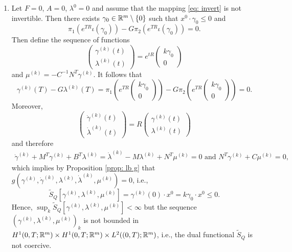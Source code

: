 \documentclass[11pt]{article}
\begin{document}
\begin{remark}
\begin{enumerate}
    \item Let $F=0$, $A=0$, $\lambda^0 = 0$ and assume that the mapping \eqref{eq: invert} is not invertible.
    Then there exists $\gamma_0 \in \mathbb R^m \setminus \{ 0\}$ such that $x^0 \cdot \gamma_0 \leq 0$ and 
    \[
    \pi_1 (e^{TR} \iota(\gamma_0)) - G \pi_2 (e^{TR} \iota (\gamma_0)) = 0.
    \]
    Then define the sequence of functions
    \[
    \begin{pmatrix} \gamma^{(k)}(t) \\ \lambda^{(k)}(t) \end{pmatrix} = e^{tR} \begin{pmatrix} k \gamma_0 \\ 0  \end{pmatrix}
    \]
    and $\mu^{(k)} = -C^{-1} N^T \gamma^{(k)}$.
    It follows that 
    \[
    \gamma^{(k)}(T) - G\lambda^{(k)}(T)   = \pi_1\left( e^{TR} \begin{pmatrix} k \gamma_0 \\ 0  \end{pmatrix}\right) - G \pi_2\left( e^{TR} \begin{pmatrix} k \gamma_0 \\ 0  \end{pmatrix}\right) = 0.
    \]
    Moreover,
    \[
    \begin{pmatrix} \dot{\gamma}^{(k)}(t) \\ \dot{\lambda}^{(k)}(t) \end{pmatrix} = R \begin{pmatrix} \gamma^{(k)}(t) \\ \lambda^{(k)}(t) \end{pmatrix}
    \]
    and therefore
    \begin{align*}
\dot{\gamma}^{(k)} + M^T \gamma^{(k)} + B^T \lambda^{(k)} = \dot{\lambda}^{(k)} - M \lambda^{(k)} + N^T \mu^{(k)} = 0 \text{ and } N^T \gamma^{(k)} + C\mu^{(k)} = 0,
    \end{align*}
    which implies by Proposition \ref{prop: lb g} that $g(\gamma^{(k)},\dot{\gamma}^{(k)},\lambda^{(k)},\dot{\lambda}^{(k)}, \mu^{(k)}) = 0$, i.e.,
    \[
    \tilde{S}_Q[\gamma^{(k)},\lambda^{(k)},\mu^{(k)}] = \gamma^{(k)}(0)\cdot x^0 = k \gamma_0 \cdot x^0 \leq 0.
    \]
    Hence, $\sup_k \tilde{S}_Q[\gamma^{(k)},\lambda^{(k)},\mu^{(k)}] < \infty$ but the sequence $(\gamma^{(k)},\lambda^{(k)}, \mu^{(k)})_k$ is not bounded in  $H^1(0,T; \mathbb R^m) \times H^1(0,T; \mathbb R^m) \times L^2((0,T); \mathbb R^m)$, i.e., the dual functional $\tilde{S}_Q$ is not coercive.

\end{enumerate}
\end{remark}
\end{document}
